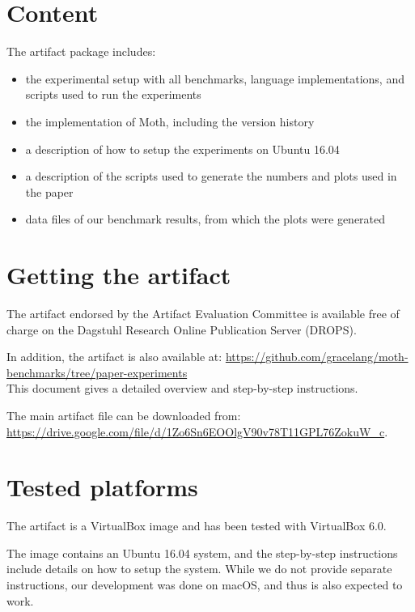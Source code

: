 \documentclass[a4paper,USenglish]{darts-v2019}
\newenvironment{content}{\section{Content}}{}
\newenvironment{getting}{\section{Getting the artifact} The artifact
endorsed by the Artifact Evaluation Committee is available free of
charge on the Dagstuhl Research Online Publication Server (DROPS).}{}
\newenvironment{platforms}{\section{Tested platforms}}{}
\begin{document}
\begin{content}
The artifact package includes:
\begin{itemize}
  \item the experimental setup with all benchmarks, language implementations, and scripts used to run the experiments
  \item the implementation of Moth, including the version history
  \item a description of how to setup the experiments on Ubuntu 16.04
  \item a description of the scripts used to generate the numbers and plots used in the paper
  \item data files of our benchmark results, from which the plots were generated
\end{itemize}
\end{content}

\begin{getting}
\label{sec:getting}

In addition, the artifact is also available at:
\url{https://github.com/gracelang/moth-benchmarks/tree/paper-experiments}\\
This document gives a detailed overview and step-by-step instructions.

The main artifact file can be downloaded from:\\
\url{https://drive.google.com/file/d/1Zo6Sn6EOOlgV90v78T11GPL76ZokuW_c}.
\end{getting}

\begin{platforms}
The artifact is a VirtualBox image and has been tested with VirtualBox 6.0.

The image contains an Ubuntu 16.04 system, and the step-by-step instructions
include details on how to setup the system.
While we do not provide separate instructions, our development was done on macOS,
and thus is also expected to work.
\end{platforms}
\end{document}
